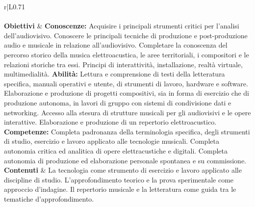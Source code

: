 \begin{longtable}{r|L{0.71\textwidth}}
   \\
   \\
  \endhead
  \hline
  \textbf{Obiettivi} &
  \textbf{Conoscenze:} \newline
    Acquisire i principali strumenti critici per l'analisi dell'audiovisivo.\newline
    Conoscere le principali tecniche di produzione e post-produzione audio e musicale in relazione all'audiovisivo.\newline
    Completare la conoscenza del percorso storico della musica elettroacustica, le aree territoriali, i compositori e le relazioni storiche tra essi.\newline
    Principi di interattività, installazione, realtà virtuale, multimedialità. \newline
  \textbf{Abilità:} \newline
    Lettura e comprensione di testi della letteratura specifica, manuali operativi e utente, di strumenti di lavoro, hardware e software.\newline
    Elaborazione e produzione di progetti compositivi, sia in forma di esercizio che di produzione autonoma, in lavori di gruppo con sistemi di condivisione dati e networking.\newline
    Accesso alla stesura di strutture musicali per gli audiovisivi e le opere interattive.\newline
    Elaborazione e produzione di un repertorio elettroacustico.\newline
  \textbf{Competenze:} \newline
    Completa padronanza della terminologia specifica, degli strumenti di studio, esercizio e lavoro applicato alle tecnologie musicali.\newline
    Completa autonomia critica ed analitica di opere elettracustiche e digitali.\newline
    Completa autonomia di produzione ed elaborazione personale spontanea e su commissione. \\
  \hline
  \textbf{Contenuti} &
    La tecnologia come strumento di esercizio e lavoro applicato alle
    discipline di studio. L'approfondimento teorico e la prova sperimentale
    come approccio d'indagine. Il repertorio musicale e la letteratura come
    guida tra le tematiche d'approfondimento. \newline

\end{longtable}
